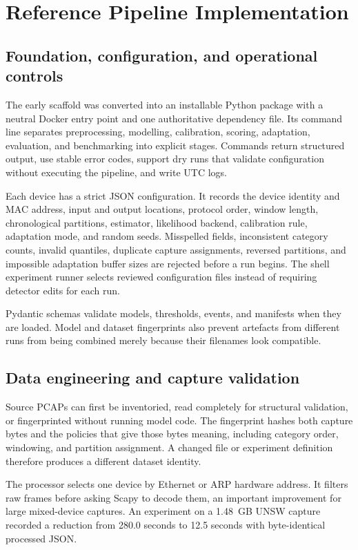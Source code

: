 \section{Reference Pipeline Implementation}

\subsection{Foundation, configuration, and operational controls}

The early scaffold was converted into an installable Python package with a
neutral Docker entry point and one authoritative dependency file. Its command
line separates preprocessing, modelling, calibration, scoring, adaptation,
evaluation, and benchmarking into explicit stages. Commands return structured
output, use stable error codes, support dry runs that validate configuration without executing the pipeline, and write UTC
logs.

Each device has a strict JSON configuration. It records the device identity and
MAC address, input and output locations, protocol order, window length,
chronological partitions, estimator, likelihood backend, calibration rule,
adaptation mode, and random seeds. Misspelled fields, inconsistent category
counts, invalid quantiles, duplicate capture assignments, reversed partitions,
and impossible adaptation buffer sizes are rejected before a run begins. The
shell experiment runner selects reviewed configuration files instead of
requiring detector edits for each run.

Pydantic schemas validate models, thresholds, events, and manifests when they
are loaded. Model and dataset fingerprints also prevent artefacts from different
runs from being combined merely because their filenames look compatible.

\subsection{Data engineering and capture validation}

Source PCAPs can first be inventoried, read completely for structural validation,
or fingerprinted without running model code. The fingerprint hashes both capture
bytes and the policies that give those bytes meaning, including category order,
windowing, and partition assignment. A changed file or experiment definition
therefore produces a different dataset identity.

The processor selects one device by Ethernet or ARP hardware address. It filters
raw frames before asking Scapy to decode them, an important improvement for large
mixed-device captures. An experiment on a 1.48~GB UNSW capture recorded a
reduction from 280.0 seconds to 12.5 seconds with byte-identical processed JSON.

